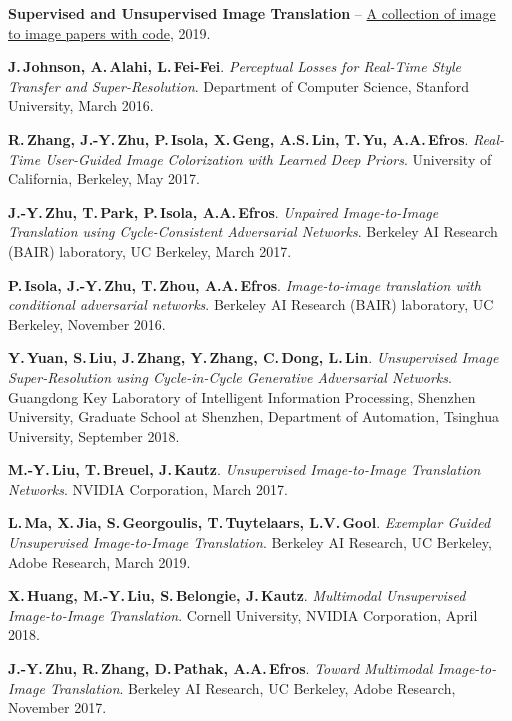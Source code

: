 \documentclass[11pt,a4paper]{extarticle}
\begin{document}
{\newpage
\begin{thebibliography}{00}
	
	\textbf{Supervised and Unsupervised Image Translation} --
	\href{https://github.com/lzhbrian/image-to-image-papers}{A collection of image to image papers with code},
	2019.

	\textbf{J.\,Johnson, A.\,Alahi, L.\,Fei-Fei}.
	\emph{Perceptual Losses for Real-Time Style Transfer and Super-Resolution}.
	Department of Computer Science, Stanford University,
	March 2016.

	\textbf{R.\,Zhang, J.-Y.\,Zhu, P.\,Isola, X.\,Geng, A.S.\,Lin, T.\,Yu, A.A.\,Efros}.
	\emph{Real-Time User-Guided Image Colorization with Learned Deep Priors}.
	University of California, Berkeley,
	May 2017.

	\textbf{J.-Y.\,Zhu, T.\,Park, P.\,Isola, A.A.\,Efros}.
	\emph{Unpaired Image-to-Image Translation using Cycle-Consistent Adversarial Networks}.
	Berkeley AI Research (BAIR) laboratory, UC Berkeley,
	March 2017.

	\textbf{P.\,Isola, J.-Y.\,Zhu, T.\,Zhou, A.A.\,Efros}.
	\emph{Image-to-image translation with conditional adversarial networks}.
	Berkeley AI Research (BAIR) laboratory, UC Berkeley,
	November 2016.

	\textbf{Y.\,Yuan, S.\,Liu, J.\,Zhang, Y.\,Zhang, C.\,Dong, L.\,Lin}.
	\emph{Unsupervised Image Super-Resolution using Cycle-in-Cycle Generative Adversarial Networks}.
	Guangdong Key Laboratory of Intelligent Information Processing, Shenzhen University,
	Graduate School at Shenzhen, Department of Automation, Tsinghua University,
	September 2018.

	\textbf{M.-Y.\,Liu, T.\,Breuel, J.\,Kautz}.
	\emph{Unsupervised Image-to-Image Translation Networks}.
	NVIDIA Corporation,
	March 2017.
	
	\textbf{L.\,Ma, X.\,Jia, S.\,Georgoulis, T.\,Tuytelaars, L.V.\,Gool}.
	\emph{Exemplar Guided Unsupervised Image-to-Image Translation}.
	Berkeley AI Research, UC Berkeley, Adobe Research,
	March 2019.

	\textbf{X.\,Huang, M.-Y.\,Liu, S.\,Belongie, J.\,Kautz}.
	\emph{Multimodal Unsupervised Image-to-Image Translation}.
	Cornell University, NVIDIA Corporation,
	April 2018.
	
	\textbf{J.-Y.\,Zhu, R.\,Zhang, D.\,Pathak, A.A.\,Efros}.
	\emph{Toward Multimodal Image-to-Image Translation}.
	Berkeley AI Research, UC Berkeley, Adobe Research,
	November 2017.
	

\end{thebibliography}}
\end{document}
